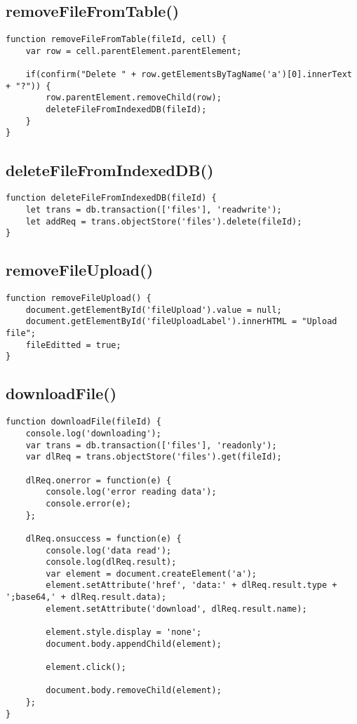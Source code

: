 \documentclass[letterpaper]{article}
\begin{document}
\subsection{removeFileFromTable()}

\begin{lstlisting}[firstnumber=135]
function removeFileFromTable(fileId, cell) {
    var row = cell.parentElement.parentElement;

    if(confirm("Delete " + row.getElementsByTagName('a')[0].innerText + "?")) {
        row.parentElement.removeChild(row);
        deleteFileFromIndexedDB(fileId);
    }
}
\end{lstlisting}

\subsection{deleteFileFromIndexedDB()}

\begin{lstlisting}[firstnumber=144]
function deleteFileFromIndexedDB(fileId) {
    let trans = db.transaction(['files'], 'readwrite');
    let addReq = trans.objectStore('files').delete(fileId);
}
\end{lstlisting}

\subsection{removeFileUpload()}

\begin{lstlisting}[firstnumber=149]
function removeFileUpload() {
    document.getElementById('fileUpload').value = null;
    document.getElementById('fileUploadLabel').innerHTML = "Upload file";
    fileEditted = true;
}
\end{lstlisting}

\subsection{downloadFile()}

\begin{lstlisting}[firstnumber=155]
function downloadFile(fileId) {
    console.log('downloading');
    var trans = db.transaction(['files'], 'readonly');
    var dlReq = trans.objectStore('files').get(fileId);

    dlReq.onerror = function(e) {
        console.log('error reading data');
        console.error(e);
    };

    dlReq.onsuccess = function(e) {
        console.log('data read');
        console.log(dlReq.result);
        var element = document.createElement('a');
        element.setAttribute('href', 'data:' + dlReq.result.type + ';base64,' + dlReq.result.data);
        element.setAttribute('download', dlReq.result.name);

        element.style.display = 'none';
        document.body.appendChild(element);

        element.click();

        document.body.removeChild(element);
    };
}
\end{lstlisting}
\end{document}
